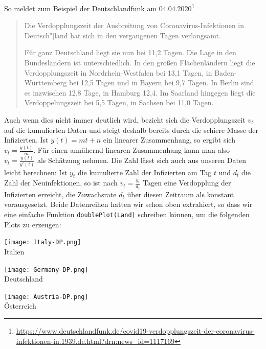 \documentclass[a4paper,11pt]{article}
\begin{document}
So meldet zum Beispiel der Deutschlandfunk am 04.04.2020\footnote{\raggedright
  \url{https://www.deutschlandfunk.de/covid19-verdopplungszeit-der-coronavirus-infektionen-in.1939.de.html?drn:news_id=1117169}}
\begin{quote}
  Die Verdopplungszeit der Ausbreitung von Coronavirus-Infektionen in
  Deutsch"|land hat sich in den vergangenen Tagen verlangsamt.

  Für ganz Deutschland liegt sie nun bei 11{,}2 Tagen. Die Lage in den
  Bundesländern ist unterschiedlich. In den großen Flächenländern liegt die
  Verdopplungszeit in Nordrhein-Westfalen bei 13{,}1 Tagen, in
  Baden-Württemberg bei 12{,}5 Tagen und in Bayern bei 9{,}7 Tagen. In Berlin
  sind es inzwischen 12{,}8 Tage, in Hamburg 12{,}4. Im Saarland hingegen
  liegt die Verdoppelungszeit bei 5{,}5 Tagen, in Sachsen bei 11{,}0 Tagen.
\end{quote}
Auch wenn dies nicht immer deutlich wird, bezieht sich die Verdopplungszeit
$v_t$ auf die kumulierten Daten und steigt deshalb bereits durch die schiere
Masse der Infizierten.  Ist $y(t)=mt+n$ ein linearer Zusammenhang, so ergibt
sich $v_t=\frac{y(t)}{m}$. Für einen annähernd linearen Zusammenhang kann man
also $v_t=\frac{y(t)}{y'(t)}$ als Schätzung nehmen.  Die Zahl lässt sich auch
aus unseren Daten leicht berechnen: Ist $y_t$ die kumulierte Zahl der
Infizierten am Tag $t$ und $d_t$ die Zahl der Neuinfektionen, so ist nach
$v_t=\frac{y_t}{d_t}$ Tagen eine Verdopplung der Infizierten erreicht, die
Zuwachsrate $d_t$ über diesen Zeitraum als konstant vorausgesetzt.  Beide
Datenreihen hatten wir schon oben extrahiert, so dass wir eine einfache
Funktion \texttt{doublePlot(Land)} schreiben können, um die folgenden Plots zu
erzeugen:
\begin{center}  
  \begin{minipage}{.33\textwidth}\centering
    \texttt{[image: Italy-DP.png]}\\[1em] {Italien}
  \end{minipage}\hfill
  \begin{minipage}{.33\textwidth}\centering
    \texttt{[image: Germany-DP.png]}\\[1em] {Deutschland}
  \end{minipage}\hfill
  \begin{minipage}{.33\textwidth}\centering
    \texttt{[image: Austria-DP.png]}\\[1em] {Österreich}
  \end{minipage}
\end{center}
\end{document}
